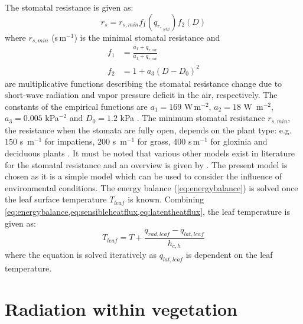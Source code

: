 The stomatal resistance is given as:
\begin{equation}
{r_s} = {r_{s,{\mathit{min}}}}{f_1}({q_{r,}}_{sw}){f_2}(D)
\label{eq:rs}
\end{equation}
where $r_{\mathit{s,min}}$ (s\,m$^{-1}$) is the minimal stomatal resistance and
\begin{align}
f_1 &= \frac{a_1 + q_{\mathit{r,sw}}}{a_1 + q_{\mathit{r,sw}}}\\
f_2 &= 1 + a_3 (D-D_0)^2
\end{align}
are multiplicative functions describing the stomatal resistance change due to short-wave radiation and vapor pressure deficit in the air, respectively. The constants of the empirical functions are $a_1=169$ W\,m$^{-2}$, $a_2=18$ W~m$^{-2}$, $a_3=\num{0.005}$ kPa$^{-2}$ and $D_0=1.2$ kPa \citep{Kichah2012}. The minimum stomatal resistance $r_{s,\mathit{min}}$, the resistance when the stomata are fully open, depends on the plant type: e.g. $150$ s~m$^{-1}$ for impatiens, $200$ s~m$^{-1}$ for grass, $400$ s\,m$^{-1}$ for gloxinia and deciduous plants \citep{Baille1994, Bruse1998}. It must be noted that various other models exist in literature for the stomatal resistance and an overview is given by \cite{Damour2010}. The present model is chosen as it is a simple model which can be used to consider the influence of environmental conditions. The energy balance (\cref{eq:energybalance}) is solved once the leaf surface temperature $T_{\mathit{leaf}}$ is known. Combining \cref{eq:energybalance,eq:sensibleheatflux,eq:latentheatflux}, the leaf temperature is given as:
\begin{equation}
{T_{\mathit{leaf}}} = T + \frac{{{q_{\mathit{rad,leaf}}} - {q_{\mathit{lat,leaf}}}}}{{{h_{c,h}}}}
\label{eq:solveleaft}
\end{equation}
where the equation is solved iteratively as $q_{\mathit{lat,leaf}}$ is dependent on the leaf temperature.

\section{Radiation within vegetation}
\label{sec:vegradiation}

